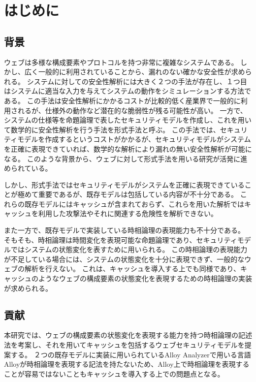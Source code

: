 \documentclass[journal]{IEEEtran}
\begin{document}
\section{はじめに}
\label{sec:introduction}

\subsection{背景}
ウェブは多様な構成要素やプロトコルを持つ非常に複雑なシステムである。
しかし、広く一般的に利用されていることから、漏れのない確かな安全性が求められる。
システムに対しての安全性解析には大きく２つの手法が存在し、１つ目はシステムに適当な入力を与えてシステムの動作をシミュレーションする方法である。
この手法は安全性解析にかかるコストが比較的低く産業界で一般的に利用されるが、仕様外の動作など潜在的な脆弱性が残る可能性が高い。
一方で、システムの仕様等を命題論理で表したセキュリティモデルを作成し、これを用いて数学的に安全性解析を行う手法を形式手法と呼ぶ。
この手法では、セキュリティモデルを作成するというコストがかかるが、セキュリティモデルがシステムを正確に表現できていれば、数学的な解析により漏れの無い安全性解析が可能になる。
このような背景から、ウェブに対して形式手法を用いる研究が活発に進められている\cite{based-model, cookie-model}。

しかし、形式手法ではセキュリティモデルがシステムを正確に表現できていることが極めて重要であるが、既存モデル\cite{based-model, cookie-model}は包括している内容が不十分である。
これらの既存モデルにはキャッシュが含まれておらず、これらを用いた解析ではキャッシュを利用した攻撃法やそれに関連する危険性を解析できない。

また一方で、既存モデルで実装している時相論理の表現能力も不十分である。
そもそも、時相論理は時間変化を表現可能な命題論理であり、セキュリティモデルではシステムの状態変化を表すために用いられる。
この時相論理の表現能力が不足している場合には、システムの状態変化を十分に表現できず、一般的なウェブの解析を行えない。
これは、キャッシュを導入する上でも同様であり、キャッシュのようなウェブの構成要素の状態変化を表現するための時相論理の実装が求められる。

\subsection{貢献}
本研究では、ウェブの構成要素の状態変化を表現する能力を持つ時相論理の記述法を考案し、それを用いてキャッシュを包括するウェブセキュリティモデルを提案する。
２つの既存モデルに実装に用いられているAlloy Analyzerで用いる言語Alloyが時相論理を表現する記法を持たないため、Alloy上で時相論理を表現することが容易ではないこともキャッシュを導入する上での問題点となる。
\end{document}
